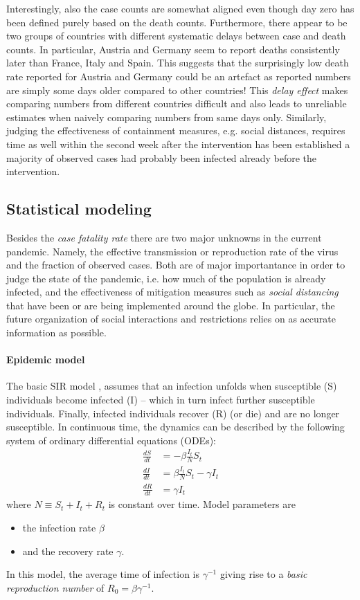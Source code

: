 \documentclass[a4paper]{tufte-handout}
\begin{document}
Interestingly, also the case counts are somewhat aligned even though
day zero has been defined purely based on the death
counts. Furthermore, there appear to be two groups of countries with
different systematic delays between case and death counts. In
particular, Austria and Germany seem to report deaths consistently
later than France, Italy and Spain. This suggests that the
surprisingly low death rate reported for Austria and Germany could be
an artefact as reported numbers are simply some days older compared to
other countries! This {\em delay effect} makes comparing numbers from
different countries difficult and also leads to unreliable estimates
when naively comparing numbers from same days only. Similarly, judging
the effectiveness of containment measures, e.g. social distances,
requires time as well within the second week after the intervention
has been established a majority of observed cases had probably been
infected already before the intervention.

\subsection{Statistical modeling}

Besides the {\em case fatality rate} there are two major unknowns in
the current pandemic. Namely, the effective transmission or
reproduction rate of the virus and the fraction of observed
cases. Both are of major importantance in order to judge the state of
the pandemic, i.e. how much of the population is already infected, and
the effectiveness of mitigation measures such as {\em social
  distancing} that have been or are being implemented around the
globe. In particular, the future organization of social interactions
and restrictions relies on as accurate information as possible.

\paragraph{Epidemic model}
The basic SIR model \cite{Newman}, assumes that an infection unfolds when
susceptible (S) individuals become infected (I) -- which in turn
infect further susceptible individuals. Finally, infected individuals
recover (R) (or die) and are no longer susceptible. In continuous
time, the dynamics can be described by the following system of
ordinary differential equations (ODEs):
\begin{align*}
  \frac{dS}{dt} &= - \beta \frac{I_t}{N} S_t \\
  \frac{dI}{dt} &= \beta \frac{I_t}{N} S_t - \gamma I_t \\
  \frac{dR}{dt} &= \gamma I_t
\end{align*}
where $N \equiv S_t + I_t + R_t$ is constant over time. Model
parameters are
\begin{itemize}
\item the infection rate $\beta$
\item and the recovery rate $\gamma$.
\end{itemize}
In this model, the average time of infection is $\gamma^{-1}$ giving
rise to a {\em basic reproduction number} of $R_0 = \beta
\gamma^{-1}$.
\end{document}
